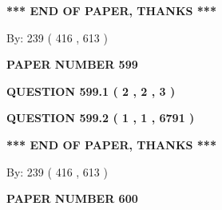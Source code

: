 \documentclass[12pt]{article}
\begin{document}
  
   
   
 \vspace{0.2in}
 
   
   
   
   
\vspace{1.0in} 
{\textbf{\large{ *** END OF PAPER, THANKS *** }}} 
   
   
\hspace{1.0in} By: 
 239 ( 416 ,  613 )
   
   
   
   
\newpage 
\setcounter{page}{ 
   599001 } 
   
   
   
   
 {\textbf{ \Large{ PAPER NUMBER  599  }}}
   
   
\vspace{0.2in}
   
   
   
   
   
   
 \vspace{0.2in}
 
 
 
 
   
   
  
\vspace{0.2in}
  
{\textbf{\Large{QUESTION
599.1 
 ( 2 , 2 , 3 )
}}}
  
  
  
\vspace{0.2in}
  
{\textbf{\Large{QUESTION
599.2 
 ( 1 , 1 , 6791 )
}}}
  
  
   
   
 \vspace{0.2in}
 
   
   
   
   
\vspace{1.0in} 
{\textbf{\large{ *** END OF PAPER, THANKS *** }}} 
   
   
\hspace{1.0in} By: 
 239 ( 416 ,  613 )
   
   
   
   
\newpage 
\setcounter{page}{ 
   600001 } 
   
   
   
   
 {\textbf{ \Large{ PAPER NUMBER  600  }}}
   
\end{document}
